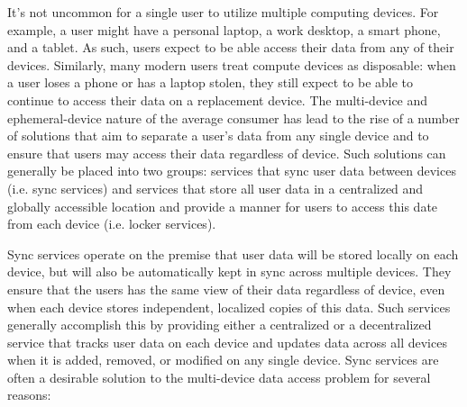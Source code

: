 It's not uncommon for a single user to utilize multiple computing
devices. For example, a user might have a personal laptop, a work
desktop, a smart phone, and a tablet. As such, users expect to be able
access their data from any of their devices. Similarly, many modern
users treat compute devices as disposable: when a user loses a phone
or has a laptop stolen, they still expect to be able to continue to
access their data on a replacement device. The multi-device and
ephemeral-device nature of the average consumer has lead to the rise
of a number of solutions that aim to separate a user's data from any
single device and to ensure that users may access their data
regardless of device. Such solutions can generally be placed into two
groups: services that sync user data between devices (i.e. sync
services) and services that store all user data in a centralized and
globally accessible location and provide a manner for users to access
this date from each device (i.e. locker services).

Sync services operate on the premise that user data will be stored
locally on each device, but will also be automatically kept in sync
across multiple devices. They ensure that the users has the same view
of their data regardless of device, even when each device stores
independent, localized copies of this data. Such services generally
accomplish this by providing either a centralized or a decentralized
service that tracks user data on each device and updates data across
all devices when it is added, removed, or modified on any single
device. Sync services are often a desirable solution to the
multi-device data access problem for several reasons:

